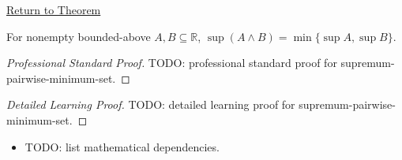 \newpage
{}
\label{prf:supremum-pairwise-minimum-set}

\begin{remark*}[Return]
\hyperref[thm:supremum-pairwise-minimum-set]{Return to Theorem}
\end{remark*}

\begin{theorem*}
For nonempty bounded-above $A,B\subseteq\mathbb{R}$,
$\sup(A\wedge B)=\min\{\sup A,\sup B\}$.
\end{theorem*}

\begin{proof}[Professional Standard Proof]
\LRAProofBodyStart
TODO: professional standard proof for supremum-pairwise-minimum-set.
\end{proof}

\begin{proof}[Detailed Learning Proof]
\LRAProofBodyStart
TODO: detailed learning proof for supremum-pairwise-minimum-set.
\end{proof}

\begin{remark*}
\end{remark*}

\begin{dependencies}
\begin{itemize}
  \item TODO: list mathematical dependencies.
\end{itemize}
\end{dependencies}

\clearpage
